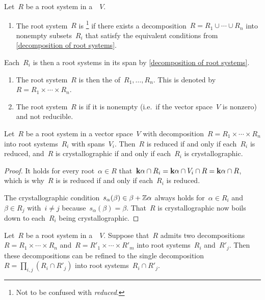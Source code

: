 \begin{definition}
  Let~$R$ be a root system in a~{\vectorspace{$\kf$}}~$V$.
  \begin{enumerate}
    \item
      The root system~$R$ is %
      \footnote{Not to be confused with \emph{reduced}.}
      if there exists a decomposition~$R = R_1 \cup \dotsb \cup R_n$ into nonempty subsets~$R_i$ that satisfy the equivalent conditions from \cref{decomposition of root systems}.
  \end{enumerate}
  Each~$R_i$ is then a root systems in its span by \cref{decomposition of root systems}.
  \begin{enumerate}[resume]
    \item
      The root system~$R$ is then the  of~$R_1, \dotsc, R_n$.
      This is denoted by~$R = R_1 \times \dotsb \times R_n$.
    \item
      The root system~$R$ is  if it is nonempty (i.e.\ if the vector space~$V$ is nonzero) and not reducible.
  \end{enumerate}
\end{definition}


\begin{lemma}
  Let~$R$ be a root system in a vector space~$V$ with decomposition~$R = R_1 \times \dotsb \times R_n$ into root systems~$R_i$ with spans~$V_i$.
  Then~$R$ is reduced if and only if each~$R_i$ is reduced, and~$R$ is crystallographic if and only if each~$R_i$ is crystallographic.
\end{lemma}


\begin{proof}
  It holds for every root~$\alpha \in R$ that~$\mathbf{k} \alpha \cap R_i = \mathbf{k} \alpha \cap V_i \cap R = \mathbf{k} \alpha \cap R$, which is why~$R$ is is reduced if and only if each~$R_i$ is reduced.

  The crystallographic condition~$s_\alpha(\beta) \in \beta + \mathbb{Z} \alpha$ always holds for~$\alpha \in R_i$ and~$\beta \in R_j$ with~$i \neq j$ because~$s_\alpha(\beta) = \beta$.
  That~$R$ is crystallographic now boils down to each~$R_i$ being crystallographic.
\end{proof}


\begin{lemma}
  \label{common refinement of root system decomposition}
  Let~$R$ be a root system in a~{\vectorspace{$\kf$}}~$V$.
  Suppose that~$R$ admits two decompositions~$R = R_1 \times \dotsb \times R_n$ and~$R = R'_1 \times \dotsb \times R'_m$ into root systems~$R_i$ and~$R'_j$.
  Then these decompositions can be refined to the single decomposition~$R = \prod_{i,j} (R_i \cap R'_j)$ into root systems~$R_i \cap R'_j$.
\end{lemma}


